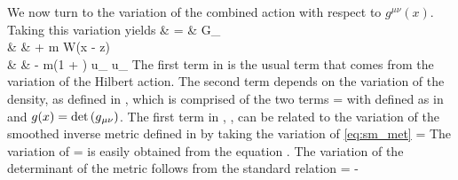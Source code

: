 \documentclass{article}
\begin{document}
We now turn to the variation of the combined action with respect
to $g^{\mu\nu}(x)$. Taking this variation yields
\bea\label{eq:var_I_g}
  & = &
     G_{\mu\nu}  \,\,
   \var{\imet{\gm}{\gn}} \nonumber \\
& &
 +  m  \vwrt{\gr}{\imet{\gm}{\gn}}
      W(\vec x - \vec z) \nonumber \\
& &
 -  m(1 + \erg) u_{\mu} u_{\nu} \var{\imet{\gm}{\gn}} \eqp
\eea
The first term in  is the usual term that comes from the
variation of the Hilbert action.  The second term depends on the variation of the density,
as defined in , which is comprised of the two terms
\be\label{eq:var_rho}
\vwrt{\gr}{\imet{\gm}{\gn}} = 
\ee
with \gL defined as in  and $g(x) = \det{\ensuremath{\left( { {g}{{}_{\mu \nu} } } \right)} }$.
The first term in , \var{\smet{\gm\gn}}, can be related to
the variation of the smoothed inverse metric defined in  by
taking the variation of \ref{eq:sm_met}
\bes
  \var{\smet{\gs\gt}} = \smet{\gs\ga} \var{\simet{\ga\gb}} \smet{\gb\gt} \eqp
\ees
The variation of \simet{\ga\gb}
\bes
  \var{\simet{\ga\gb}} =   \var{\imet{\ga}{\gb}}
\ees
is easily obtained from the equation .
The variation of the determinant of the metric follows from the standard relation
\bes
  \var{\metd} = - \metd \met{\gm}{\gn} \var{\imet{\gm}{\gn}} \eqp
\ees
\end{document}
